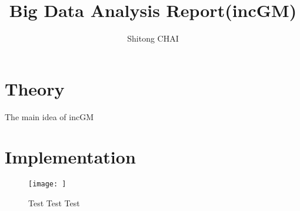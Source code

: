 \documentclass[a4paper, 12pt]{report}
\title{Big Data Analysis Report(incGM)}
\date{}
\author{Shitong CHAI}
\begin{document}
\maketitle
\tableofcontents

\chapter {Theory}
The main idea of incGM 
\chapter {Implementation}
\begin{figure}[H]
\centering
\texttt{[image: ]}
\caption{Test Test Test}
\end{figure}


{}

\end{document}
